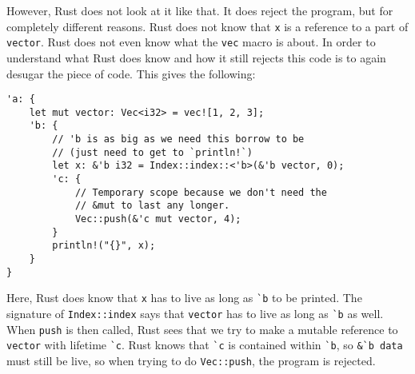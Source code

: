 However, Rust does not look at it like that. It does reject the program, but for completely different reasons. Rust does not know that \texttt{x} is a reference to a part of \texttt{vector}. Rust does not even know what the \texttt{vec} macro is about. In order to understand what Rust does know and how it still rejects this code is to again desugar the piece of code. This gives the following: 

\begin{verbatim}
'a: {
    let mut vector: Vec<i32> = vec![1, 2, 3];
    'b: {
        // 'b is as big as we need this borrow to be
        // (just need to get to `println!`)
        let x: &'b i32 = Index::index::<'b>(&'b vector, 0);
        'c: {
            // Temporary scope because we don't need the
            // &mut to last any longer.
            Vec::push(&'c mut vector, 4);
        }
        println!("{}", x);
    }
}
\end{verbatim}

Here, Rust does know that \verb|x| has to live as long as \verb|`b| to be printed. The signature of \verb|Index::index| says that \verb|vector| has to live as long as \verb|`b| as well. When \verb|push| is then called, Rust sees that we try to make a mutable reference to \verb|vector| with lifetime \verb|`c|. Rust knows that \verb|`c| is contained within \verb|`b|, so \verb|&`b data| must still be live, so when trying to do \verb|Vec::push|, the program is rejected. 
